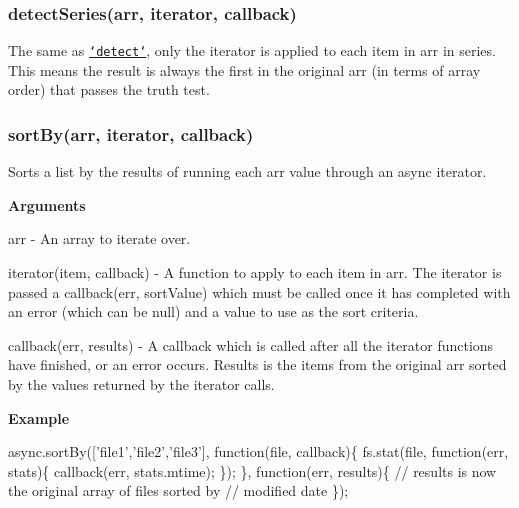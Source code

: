 \label{_detectSeries}%
 \subsubsection*{detect\+Series(arr, iterator, callback)}

The same as \href{#detect}{\tt `detect`}, only the {\ttfamily iterator} is applied to each item in {\ttfamily arr} in series. This means the result is always the first in the original {\ttfamily arr} (in terms of array order) that passes the truth test.





\label{_sortBy}%
 \subsubsection*{sort\+By(arr, iterator, callback)}

Sorts a list by the results of running each {\ttfamily arr} value through an async {\ttfamily iterator}.

{\bfseries Arguments}


\begin{DoxyItemize}
\item {\ttfamily arr} -\/ An array to iterate over.
\item {\ttfamily iterator(item, callback)} -\/ A function to apply to each item in {\ttfamily arr}. The iterator is passed a {\ttfamily callback(err, sort\+Value)} which must be called once it has completed with an error (which can be {\ttfamily null}) and a value to use as the sort criteria.
\item {\ttfamily callback(err, results)} -\/ A callback which is called after all the {\ttfamily iterator} functions have finished, or an error occurs. Results is the items from the original {\ttfamily arr} sorted by the values returned by the {\ttfamily iterator} calls.
\end{DoxyItemize}

{\bfseries Example}


\begin{DoxyCode}
async.sortBy([\textcolor{stringliteral}{'file1'},\textcolor{stringliteral}{'file2'},\textcolor{stringliteral}{'file3'}], \textcolor{keyword}{function}(file, callback)\{
    fs.stat(file, \textcolor{keyword}{function}(err, stats)\{
        callback(err, stats.mtime);
    \});
\}, \textcolor{keyword}{function}(err, results)\{
    \textcolor{comment}{// results is now the original array of files sorted by}
    \textcolor{comment}{// modified date}
\});
\end{DoxyCode}


